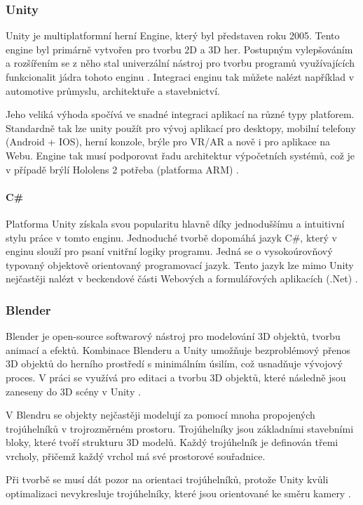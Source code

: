 \subsubsection{Unity}
Unity je multiplatformní herní Engine, který byl představen roku 2005. Tento engine byl primárně vytvořen pro tvorbu 2D a 3D her. Postupným vylepšováním a rozšířením se z něho stal univerzální nástroj pro tvorbu programů využívajících funkcionalit jádra tohoto enginu . Integraci enginu tak můžete nalézt například v automotive průmyslu, architektuře a stavebnictví.  

Jeho veliká výhoda spočívá ve snadné integraci aplikací na různé typy platforem. Standardně tak lze unity použít pro vývoj aplikací pro desktopy, mobilní telefony (Android + IOS), herní konzole, brýle pro VR/AR a nově i pro aplikace na Webu. Engine tak musí podporovat řadu architektur výpočetních systémů, což je v případě brýlí Hololens 2 potřeba (platforma ARM)  \cite{unity1,unity2}. 
\paragraph{C\#}
Platforma Unity získala svou popularitu hlavně díky jednoduššímu a intuitivní stylu práce v tomto enginu. Jednoduché tvorbě dopomáhá jazyk C\#, který v enginu slouží pro psaní vnitřní logiky programu. Jedná se o vysokoúrovňový typovaný objektově orientovaný programovací jazyk. Tento jazyk lze mimo Unity nejčastěji nalézt v beckendové části Webových a formulářových aplikacích (.Net) \cite{cSharp}. 
\subsubsection{Blender}
Blender je open-source softwarový nástroj pro modelování 3D objektů, tvorbu animací a efektů. Kombinace Blenderu a Unity umožňuje bezproblémový přenos 3D objektů do herního prostředí s minimálním úsilím, což usnadňuje vývojový proces. V práci se využívá pro editaci a tvorbu 3D objektů, které následně jsou zaneseny do 3D scény v Unity \cite{blenderUnity,blender}. 

V Blendru se objekty nejčastěji modelují za pomocí mnoha propojených trojúhelníků v trojrozměrném prostoru. Trojúhelníky jsou základními stavebními bloky, které tvoří strukturu 3D modelů. Každý trojúhelník je definován třemi vrcholy, přičemž každý vrchol má své prostorové souřadnice. 

Při tvorbě se musí dát pozor na orientaci trojúhelníků, protože Unity kvůli optimalizaci nevykresluje trojúhelníky, které jsou orientované ke směru kamery \cite{blenderUnity}.
